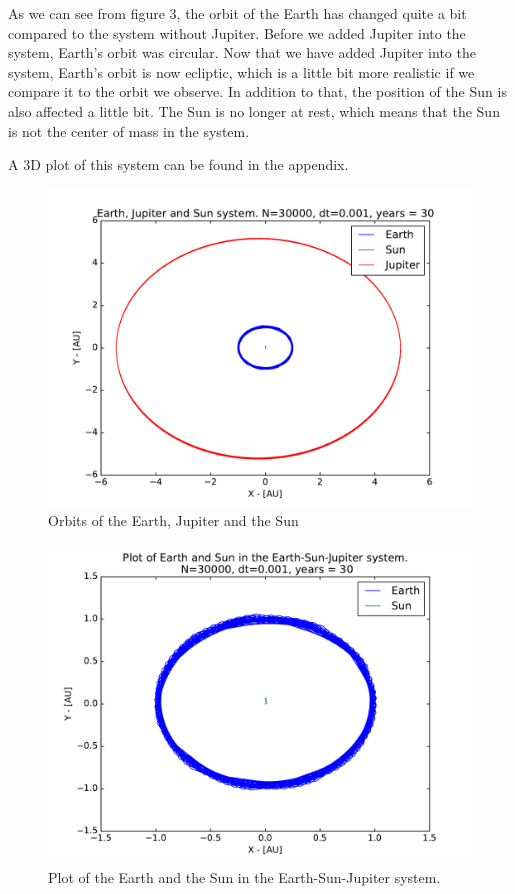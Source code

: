 \documentclass[12pt]{article}
\begin{document}
As we can see from figure 3, the orbit of the Earth has changed quite a bit compared to the system without Jupiter. Before we added Jupiter into the system, Earth's orbit was circular. Now that we have added Jupiter into the system, Earth's orbit is now ecliptic, which is a little bit more realistic if we compare it to the orbit we observe. In addition to that, the position of the Sun is also affected a little bit. The Sun is no longer at rest, which means that the Sun is not the center of mass in the system.

A 3D plot of this system can be found in the appendix.

\begin{figure}[hbtp]
\centering
\includegraphics[width=\linewidth]{Plots/Earth_Sun_Jupiter.pdf}
\caption{Orbits of the Earth, Jupiter and the Sun}
\end{figure}

\begin{figure}[hbtp]
\centering
\includegraphics[width=\linewidth]{Plots/ESJ_EarthandSun.pdf}
\caption{Plot of the Earth and the Sun in the Earth-Sun-Jupiter system.}
\end{figure}
\end{document}
